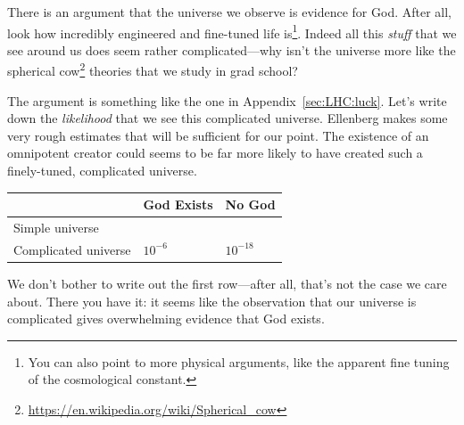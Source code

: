 There is an argument that the universe we observe is evidence for God. After all, look how incredibly engineered and fine-tuned life is\footnote{You can also point to more physical arguments, like the apparent fine tuning of the cosmological constant.}. Indeed all this \emph{stuff} that we see around us does seem rather complicated---why isn't the universe more like the spherical cow\footnote{\url{https://en.wikipedia.org/wiki/Spherical_cow}} theories that we study in grad school? 

The argument is something like the one in Appendix~\ref{sec:LHC:luck}. Let's write down the \emph{likelihood} that we see this complicated universe. Ellenberg makes some very rough estimates that will be sufficient for our point. The existence of an omnipotent creator could seems to be far more likely to have created such a finely-tuned, complicated universe.
\begin{center}
\begin{tabular}{l|ll} \toprule %
		& God Exists & No God
		\\ \hline
		Simple universe &  & 
		\\
		Complicated universe & $10^{-6}$  & $10^{-18}$
		\\ \bottomrule
\end{tabular}
\end{center}
We don't bother to write out the first row---after all, that's not the case we care about. There you have it: it seems like the observation that our universe is complicated gives overwhelming evidence that God exists. 

